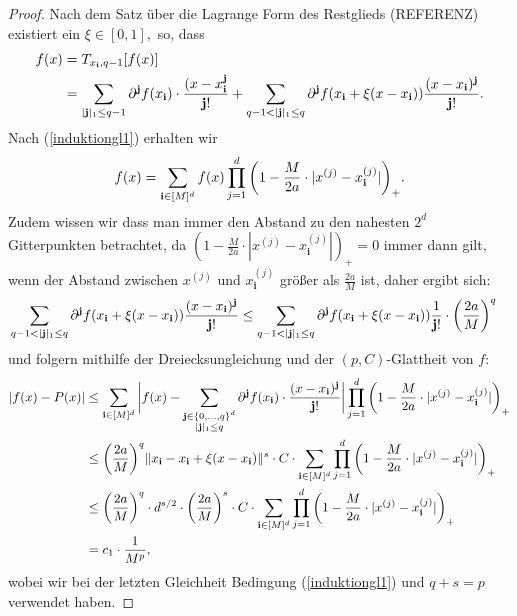 \begin{proof}
Nach dem Satz über die Lagrange Form des Restglieds (REFERENZ) existiert ein $\xi \in [0, 1],$ so, dass 
\begin{equation*}
\begin{split}
f(x) & = T_{x_{\mathbf{i}},q - 1}[f(x)] \\
& = \sum_{|\mathbf{j}|_1 \leq q - 1}  \partial^{\mathbf{j}}f(x_{\mathbf{i}}) \cdot \frac{ (x - x_{\mathbf{i}}^{\mathbf{j}} }{\mathbf{j}!} + \sum_{q - 1 < |\mathbf{j}|_1 \leq q} \partial^{\mathbf{j}}f(x_{\mathbf{i}} + \xi(x - x_{\mathbf{i}})) \frac{ (x - x_{\mathbf{i}})^{\mathbf{j}} }{\mathbf{j}!}.
\end{split}
\end{equation*}
Nach (\ref{induktiongl1}) erhalten wir 
$$f(x) = \sum_{\mathbf{i} \in [M]^d} f(x) \prod_{j = 1}^d \bigg(1 - \frac{M}{2a} \cdot |x^{(j)} - x_{\mathbf{i}}^{(j)}|\bigg)_+.$$ Zudem wissen wir dass man immer den Abstand zu den nahesten $2^d$ Gitterpunkten betrachtet, da  $(1 - \frac{M}{2a} \cdot |x^{(j)} - x_{\mathbf{i}}^{(j)}|)_+ = 0$ immer dann gilt, wenn der Abstand zwischen $x^{(j)}$ und $x_{\mathbf{i}}^{(j)}$ größer als $\frac{2a}{M}$ ist, daher ergibt sich:
\begin{equation*}
\begin{split}
&\sum_{q - 1 < |\mathbf{j}|_1 \leq q} \partial^{\mathbf{j}}f(x_{\mathbf{i}} + \xi(x - x_{\mathbf{i}})) \frac{ (x - x_{\mathbf{i}})^{\mathbf{j}} }{\mathbf{j}!} \leq \sum_{q - 1 < |\mathbf{j}|_1 \leq q} \partial^{\mathbf{j}}f(x_{\mathbf{i}} + \xi(x - x_{\mathbf{i}})) \frac{1}{\mathbf{j}!} \cdot \bigg(\frac{2a}{M}\bigg)^q
\end{split}
\end{equation*} 
und folgern mithilfe der Dreiecksungleichung und der $(p,C)$-Glattheit von $f$:
\begin{equation*}
\begin{split}
|f(x) - P(x)| & \leq \sum_{\mathbf{i} \in [M]^d} \bigg|f(x) - \sum_{\substack{\mathbf{j} \in \{0,\dots,q\}^d \\|\mathbf{j}|_1 \leq q}} \partial^{\mathbf{j}}f(x_{\mathbf{i}}) \cdot \frac{(x - x_{\mathbf{i}})^{\mathbf{j}}}{\mathbf{j}!}\bigg| \prod_{j = 1}^d \bigg(1 - \frac{M}{2a} \cdot |x^{(j)} - x_{\mathbf{i}}^{(j)}|\bigg)_+ \\
& \leq \bigg(\frac{2a}{M}\bigg)^q \|x_{\mathbf{i}} - x_{\mathbf{i}} + \xi(x - x_{\mathbf{i}}) \|^s \cdot C \cdot \sum_{\mathbf{i} \in [M]^d} \prod_{j = 1}^d \bigg(1 - \frac{M}{2a} \cdot |x^{(j)} - x_{\mathbf{i}}^{(j)}|\bigg)_+ \\
& \leq \bigg(\frac{2a}{M}\bigg)^q \cdot d^{s/2} \cdot \bigg(\frac{2a}{M}\bigg)^s \cdot C \cdot \sum_{\mathbf{i} \in [M]^d} \prod_{j = 1}^d \bigg(1 - \frac{M}{2a} \cdot |x^{(j)} - x_{\mathbf{i}}^{(j)}|\bigg)_+ \\
& = c_1 \cdot \frac{1}{M^p},
\end{split}
\end{equation*}
wobei wir bei der letzten Gleichheit Bedingung (\ref{induktiongl1}) und $q + s = p$ verwendet haben.
\end{proof}

